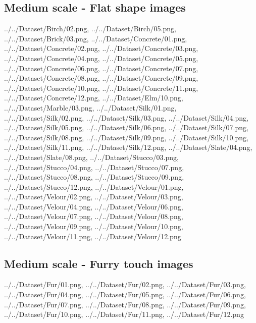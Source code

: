 \newpage
\subsection{Medium scale - Flat shape images}
{../../Dataset/Birch/02.png,
../../Dataset/Birch/05.png,
../../Dataset/Brick/03.png,
../../Dataset/Concrete/01.png,
../../Dataset/Concrete/02.png,
../../Dataset/Concrete/03.png,
../../Dataset/Concrete/04.png,
../../Dataset/Concrete/05.png,
../../Dataset/Concrete/06.png,
../../Dataset/Concrete/07.png,
../../Dataset/Concrete/08.png,
../../Dataset/Concrete/09.png,
../../Dataset/Concrete/10.png,
../../Dataset/Concrete/11.png,
../../Dataset/Concrete/12.png,
../../Dataset/Elm/10.png,
../../Dataset/Marble/03.png,
../../Dataset/Silk/01.png,
../../Dataset/Silk/02.png,
../../Dataset/Silk/03.png,
../../Dataset/Silk/04.png,
../../Dataset/Silk/05.png,
../../Dataset/Silk/06.png,
../../Dataset/Silk/07.png,
../../Dataset/Silk/08.png,
../../Dataset/Silk/09.png,
../../Dataset/Silk/10.png,
../../Dataset/Silk/11.png,
../../Dataset/Silk/12.png,
../../Dataset/Slate/04.png,
../../Dataset/Slate/08.png,
../../Dataset/Stucco/03.png,
../../Dataset/Stucco/04.png,
../../Dataset/Stucco/07.png,
../../Dataset/Stucco/08.png,
../../Dataset/Stucco/09.png,
../../Dataset/Stucco/12.png,
../../Dataset/Velour/01.png,
../../Dataset/Velour/02.png,
../../Dataset/Velour/03.png,
../../Dataset/Velour/04.png,
../../Dataset/Velour/06.png,
../../Dataset/Velour/07.png,
../../Dataset/Velour/08.png,
../../Dataset/Velour/09.png,
../../Dataset/Velour/10.png,
../../Dataset/Velour/11.png,
../../Dataset/Velour/12.png}

\newpage
\subsection{Medium scale - Furry touch images}
{../../Dataset/Fur/01.png,
../../Dataset/Fur/02.png,
../../Dataset/Fur/03.png,
../../Dataset/Fur/04.png,
../../Dataset/Fur/05.png,
../../Dataset/Fur/06.png,
../../Dataset/Fur/07.png,
../../Dataset/Fur/08.png,
../../Dataset/Fur/09.png,
../../Dataset/Fur/10.png,
../../Dataset/Fur/11.png,
../../Dataset/Fur/12.png}

\newpage
